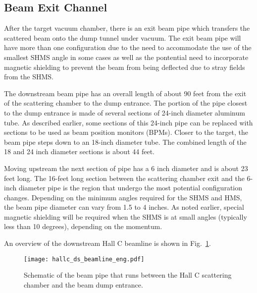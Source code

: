 {\subsection{Beam Exit Channel}

After the target vacuum chamber, there is an exit beam pipe which
transfers the scattered beam onto the dump tunnel under vacuum. The
exit beam pipe will have more than one configuration due to the need
to accommodate the use of the smallest SHMS angle in some cases as
well as the pontential need to incorporate magnetic shielding to prevent the beam
from being deflected due to stray fields from the SHMS.

The downstream beam pipe has an overall length of about 90 feet from
the exit of the scattering chamber to the dump entrance. The portion
of the pipe closest to the dump entrance is made of several sections
of 24-inch diameter aluminum tube. As described earlier, some sections
of this 24-inch pipe can be replaced with sections to be used as beam
position monitors (BPMs). Closer to the target, the beam pipe steps
down to an 18-inch diameter tube. The combined length of the 18 and 24
inch diameter sections is about 44 feet.

Moving upstream the next section of pipe has a 6 inch diameter and is
about 23 feet long. The 16-feet long section between the scattering
chamber exit and the 6-inch diameter pipe is the region that undergo
the most potential configuration changes. Depending on the minimum
angles required for the SHMS and HMS, the beam pipe diameter can vary
from 1.5 to 4 inches. As noted earlier, special magnetic shielding
will be required when the SHMS is at small angles (typically less than
10 degrees), depending on the momentum.

An overview of the downstream Hall C beamline is shown in
Fig.~\ref{fig:ds_beamline}.

\begin{figure}
\begin{center}
\texttt{[image: hallc\_ds\_beamline\_eng.pdf]}
\caption{Schematic of the beam pipe that runs between the Hall C scattering chamber and the
beam dump entrance.}
\label{fig:ds_beamline}
\end{center}
\end{figure}

}

